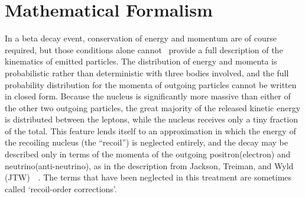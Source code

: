 

\section{Mathematical Formalism}
\label{sec:math_formalism}
		In a beta decay event, conservation of energy and momentum are of course required, but those conditions alone cannot~ provide a full description of the kinematics of emitted particles.
The distribution of energy and momenta is probabilistic rather than deterministic with three bodies involved, and the full probability distribution for the momenta of outgoing particles cannot be written in closed form.  
Because the nucleus is significantly more massive than either of the other two outgoing particles, the great majority of the released kinetic energy is distributed between the leptons, while the nucleus receives only a tiny fraction of the total.  This feature lends itself to an approximation in which the energy of the recoiling nucleus (the ``recoil'') is neglected entirely, and the decay may be described only in terms of the momenta of the outgoing positron(electron) and neutrino(anti-neutrino), as in the description from Jackson, Treiman, and Wyld (JTW)~\cite{jtw}~\cite{jtw_coulomb}.  The terms that have been neglected in this treatment are sometimes called `recoil-order corrections'.

